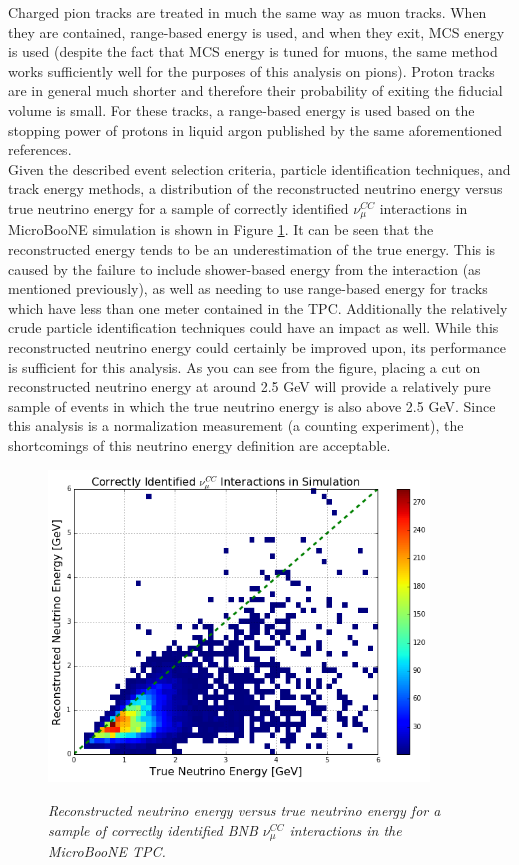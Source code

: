 Charged pion tracks are treated in much the same way as muon tracks. When they are contained, range-based energy is used, and when they exit, MCS energy is used (despite the fact that MCS energy is tuned for muons, the same method works sufficiently well for the purposes of this analysis on pions). Proton tracks are in general much shorter and therefore their probability of exiting the fiducial volume is small. For these tracks, a range-based energy is used based on the stopping power of protons in liquid argon published by the same aforementioned references.\\

Given the described event selection criteria, particle identification techniques, and track energy methods, a distribution of the reconstructed neutrino energy versus true neutrino energy for a sample of correctly identified $\nu_\mu^{CC}$ interactions in MicroBooNE simulation is shown in Figure \ref{kaon_recoenergy_2d_fig}. It can be seen that the reconstructed energy tends to be an underestimation of the true energy. This is caused by the failure to include shower-based energy from the interaction (as mentioned previously), as well as needing to use range-based energy for tracks which have less than one meter contained in the TPC. Additionally the relatively crude particle identification techniques could have an impact as well. While this reconstructed neutrino energy could certainly be improved upon, its performance is sufficient for this analysis. As you can see from the figure, placing a cut on reconstructed neutrino energy at around 2.5 GeV will provide a relatively pure sample of events in which the true neutrino energy is also above 2.5 GeV. Since this analysis is a normalization measurement (a counting experiment), the shortcomings of this neutrino energy definition are acceptable.

\begin{figure}[ht!]
\centering
	\includegraphics[width=0.9\textwidth]{Figures/kaon_recoenergy_2d.png} \\
\caption{\textit{Reconstructed neutrino energy versus true neutrino energy for a sample of correctly identified BNB $\nu_\mu^{CC}$ interactions in the MicroBooNE TPC.}}\label{kaon_recoenergy_2d_fig}
\end{figure}

